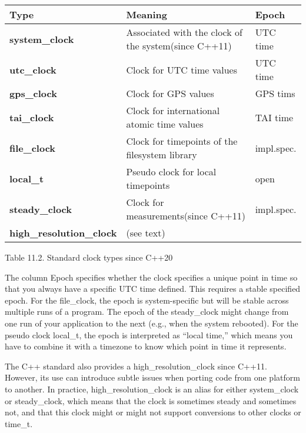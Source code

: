 \begin{longtable}[c]{|l|l|l|}
\hline
\textbf{Type}                    & \textbf{Meaning}                           & \textbf{Epoch} \\ \hline
\endfirsthead
%
\endhead
%
\textbf{system\_clock} & Associated with the clock of the system(since C++11) & UTC time   \\ \hline
\textbf{utc\_clock}              & Clock for UTC time values                  & UTC time       \\ \hline
\textbf{gps\_clock}              & Clock for GPS values                       & GPS tims       \\ \hline
\textbf{tai\_clock}              & Clock for international atomic time values & TAI time       \\ \hline
\textbf{file\_clock}   & Clock for timepoints of the filesystem library       & impl.spec. \\ \hline
\textbf{local\_t}                & Pseudo clock for local timepoints          & open           \\ \hline
\textbf{steady\_clock}           & Clock for measurements(since C++11)        & impl.spec.     \\ \hline
\textbf{high\_resolution\_clock} & (see text)                                 &                \\ \hline
\end{longtable}

\begin{center}
Table 11.2. Standard clock types since C++20
\end{center}

The column Epoch specifies whether the clock specifies a unique point in time so that you always have a specific UTC time defined. This requires a stable specified epoch. For the file\_clock, the epoch is system-specific but will be stable across multiple runs of a program. The epoch of the steady\_clock might change from one run of your application to the next (e.g., when the system rebooted). For the pseudo clock local\_t, the epoch is interpreted as “local time,” which means you have to combine it with a timezone to know which point in time it represents.

The C++ standard also provides a high\_resolution\_clock since C++11. However, its use can introduce subtle issues when porting code from one platform to another. In practice, high\_resolution\_clock is an alias for either system\_clock or steady\_clock, which means that the clock is sometimes steady and sometimes not, and that this clock might or might not support conversions to other clocks or time\_t.

